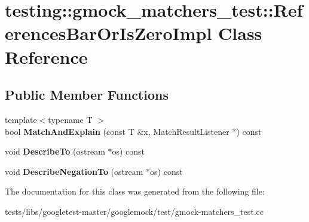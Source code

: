 \hypertarget{classtesting_1_1gmock__matchers__test_1_1ReferencesBarOrIsZeroImpl}{}\section{testing\+:\+:gmock\+\_\+matchers\+\_\+test\+:\+:References\+Bar\+Or\+Is\+Zero\+Impl Class Reference}
\label{classtesting_1_1gmock__matchers__test_1_1ReferencesBarOrIsZeroImpl}
\subsection*{Public Member Functions}
\begin{DoxyCompactItemize}
\item 
\mbox{\label{classtesting_1_1gmock__matchers__test_1_1ReferencesBarOrIsZeroImpl_ac74ff2f707bebea05a995beb77c77041}} 
{\footnotesize template$<$typename T $>$ }\\bool {\bfseries Match\+And\+Explain} (const T \&x, Match\+Result\+Listener $\ast$) const
\item 
\mbox{\label{classtesting_1_1gmock__matchers__test_1_1ReferencesBarOrIsZeroImpl_a8d8496ad72753723598efd45e6a4dcbf}} 
void {\bfseries Describe\+To} (ostream $\ast$os) const
\item 
\mbox{\label{classtesting_1_1gmock__matchers__test_1_1ReferencesBarOrIsZeroImpl_a849b65d96bf7a31b7b0e81005e466605}} 
void {\bfseries Describe\+Negation\+To} (ostream $\ast$os) const
\end{DoxyCompactItemize}


The documentation for this class was generated from the following file\+:\begin{DoxyCompactItemize}
\item 
tests/libs/googletest-\/master/googlemock/test/gmock-\/matchers\+\_\+test.\+cc\end{DoxyCompactItemize}
